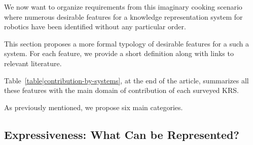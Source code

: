 We now want to organize requirements from this imaginary cooking scenario where
numerous desirable features for a knowledge representation system for robotics
have been identified without any particular order.

This section proposes a more formal typology of desirable features for a such a
system. For each feature, we provide a short definition along with links to
relevant literature.

Table~\ref{table|contribution-by-systems}, at the end of the article,
summarizes all these features with the main domain of contribution of each
surveyed KRS.

As previously mentioned, we propose six main categories.

\begin{scriptsize}
\begin{center}
\end{center}
\end{scriptsize}

\subsection{Expressiveness: What Can be Represented?}
\label{sect|expressiveness}

\begin{scriptsize}
\begin{center}
\end{center}
\end{scriptsize}


